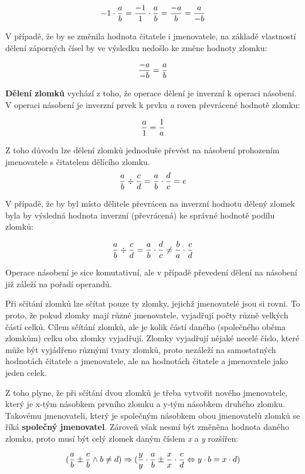 $$ -1 \cdot {a \over b} = {{-1} \over 1} \cdot {a \over b} = {{-a} \over b} = {a \over {-b}} $$

V případě, že by se změnila hodnota čitatele i jmenovatele, na základě vlastností dělení záporných čísel by ve výsledku nedošlo ke změne hodnoty zlomku:

$$ {-a \over -b } = {a \over b} $$

{\bf Dělení zlomků} vychází z toho, že operace dělení je inverzní k operaci násobení. V operaci násobení je inverzní prvek k prvku {\it a} roven převrácené hodnotě zlomku:

$$ {a\over 1} = {1 \over a }$$

Z toho důvodu lze dělení zlomků jednoduše převést na násobení prohozením jmenovatele s čitatelem dělícího zlomku.
$$  {a\over b} \div {c\over d} = {a\over b} \cdot {d\over c}  = e $$

V případě, že by byl místo dělitele převrácen na inverzní hodnotu dělený zlomek byla by výsledná hodnota inverzní (převrácená) ke správné hodnotě podílu zlomků:

$$ {a\over b} \div {c\over d} = {a\over b} \cdot {d\over c} \not = {b\over a} \cdot {c\over d} $$

Operace násobení je sice komutativní, ale v případě převedení dělení na násobení již záleží na pořadí operandů.


Při sčítání zlomků lze sčítat pouze ty zlomky, jejichž jmenovatelé jsou si rovni. To proto, že pokud zlomky mají různé jmenovatele, vyjadřují počty různě velkých částí celků. Cílem sčítání zlomků, ale je kolik částí daného (společného oběma zlomkům) celku oba zlomky vyjadřují. Zlomky vyjadřují nějaké necelé číslo, které může být vyjádřeno různými tvary zlomků, proto nezáleží na samostatných hodnotách čitatele a jmenovatele, ale na hodnotách čitatele a jmenovatele jako jeden celek.

Z toho plyne, že při sčítání dvou zlomků je třeba vytvořit nového jmenovatele, který je x-tým násobkem prvního zlomku a y-tým násobkem druhého zlomku. Takovému jmenovateli, který je společným násobkem obou jmenovatelů zlomků se říká {\bf společný jmenovatel}. Zároveň však nesmí být změněna hodnota daného zlomku, proto musí být celý zlomek daným číslem {\it x} a {\it y} rozšířen:

$$ ({a \over b} \pm {c \over b} \wedge b \not = d) \Rightarrow ({y\over y} \cdot {a\over b} \pm {x\over x}\cdot {c \over d} \Leftrightarrow y\cdot b = x \cdot d)$$

